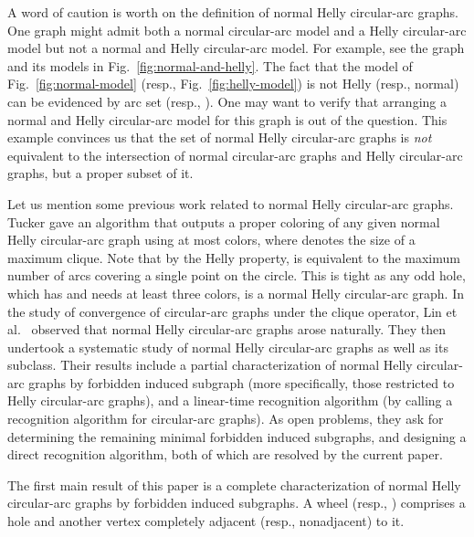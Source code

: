 \documentclass[10pt]{article}
\newcommand{\nhcag}{normal Helly circular-arc graph}
\begin{document}
A word of caution is worth on the definition of \nhcag s.  One graph
might admit both a normal circular-arc model and a Helly circular-arc
model but not a normal and Helly circular-arc model.  For example, see
the graph and its models in Fig.~\ref{fig:normal-and-helly}.  The fact
that the model of Fig.~\ref{fig:normal-model} (resp.,
Fig.~\ref{fig:helly-model}) is not Helly (resp., normal) can be
evidenced by arc set  (resp., ).  One may want to
verify that arranging a normal and Helly circular-arc model for this
graph is out of the question.  This example convinces us that the set
of \nhcag s is {\em not} equivalent to the intersection of normal
circular-arc graphs and Helly circular-arc graphs, but a proper subset
of it.

Let us mention some previous work related to normal Helly circular-arc
graphs.  Tucker \cite{tucker-75-coloring-cag} gave an algorithm that
outputs a proper coloring of any given normal Helly circular-arc graph
using at most  colors, where  denotes the size of a
maximum clique.  Note that by the Helly property,  is
equivalent to the maximum number of arcs covering a single point on
the circle.  This is tight as any odd hole, which has  and
needs at least three colors, is a \nhcag.  In the study of convergence
of circular-arc graphs under the clique operator, Lin et
al.~\cite{lin--10-clique-operator-cag} observed that normal Helly
circular-arc graphs arose naturally.  They then
\cite{lin-13-nhcag-and-subclasses} undertook a systematic study of
normal Helly circular-arc graphs as well as its subclass.  Their
results include a partial characterization of \nhcag s by forbidden
induced subgraph (more specifically, those restricted to Helly
circular-arc graphs), and a linear-time recognition algorithm (by
calling a recognition algorithm for circular-arc graphs).  As open
problems, they ask for determining the remaining minimal forbidden
induced subgraphs, and designing a direct recognition algorithm, both
of which are resolved by the current paper.

The first main result of this paper is a complete characterization of
\nhcag s by forbidden induced subgraphs.  A wheel (resp., )
comprises a hole and another vertex completely adjacent (resp.,
nonadjacent) to it.
\end{document}
